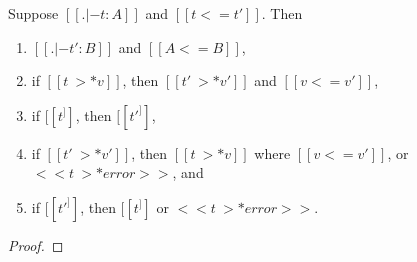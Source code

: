 \begin{theorem}
  \label{thm:gradual_guarantee}
  Suppose $[[. |- t : A]]$ and $[[t <= t']]$.  Then
  \begin{enumerate}[label=\roman*., align=left]     
  \item $[[. |- t' : B]]$ and $[[A <= B]]$,
  \item if $[[t ~>* v]]$, then $[[t' ~>* v']]$ and $[[v <= v']]$,
  \item if $[[t ^]]$, then $[[t' ^]]$,
  \item if $[[t' ~>* v']]$, then $[[t ~>* v]]$ where $[[v <= v']]$, or $<<t ~>* error>>$, and
  \item if $[[t' ^]]$, then $[[t ^]]$ or $<<t ~>* error>>$.
  \end{enumerate}
\end{theorem}
\begin{proof}
  
\end{proof}

